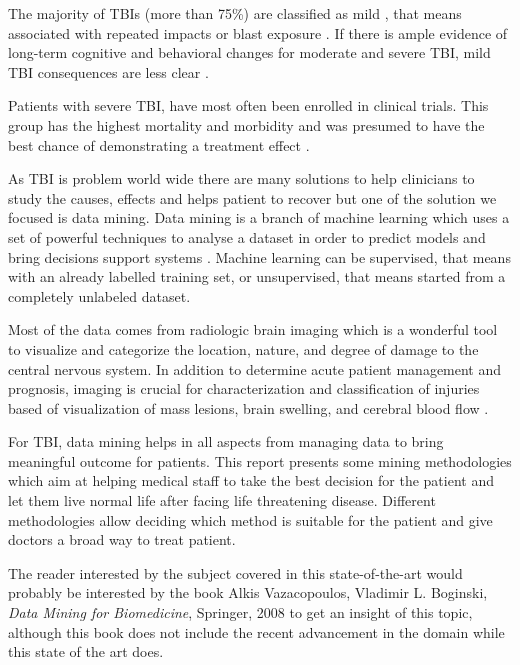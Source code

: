 \documentclass[runningheads]{llncs}
\begin{document}
The majority of TBIs (more than 75\%) are classified as mild \cite{wozniak_neurocognitive_2007}, that means associated with repeated impacts or blast exposure \cite{duhaime_common_2010}. If there is ample evidence of long-term cognitive and behavioral changes for moderate and severe TBI, mild TBI consequences are less clear \cite{wozniak_neurocognitive_2007}.

Patients with severe TBI, have most often been enrolled in clinical trials. This group has the highest mortality and morbidity and was presumed to have the best chance of demonstrating a treatment effect \cite{saatman_classification_2008}.

As TBI is problem world wide there are many solutions to help clinicians to study the causes, effects and helps patient to recover but one of the solution we focused is data mining. Data mining is a branch of machine learning which uses a set of powerful techniques to analyse a dataset in order to predict models and bring decisions support systems \cite{marcano-cedeno_data_2013}. Machine learning can be supervised, that means with an already labelled training set, or unsupervised, that means started from a completely unlabeled dataset.

Most of the data comes from radiologic brain imaging which is a wonderful tool to visualize and categorize the location, nature, and degree of damage to the central nervous system. In addition to determine acute patient management and prognosis, imaging is crucial for characterization and classification of injuries based of visualization of mass lesions, brain swelling, and cerebral blood flow \cite{duhaime_common_2010}.

For TBI, data mining helps in all aspects from managing data to bring meaningful outcome for patients. This report presents some mining methodologies which aim at helping medical staff to take the best decision for the patient and let them live normal life after facing life threatening disease. Different methodologies allow deciding which method is suitable for the patient and give doctors a broad way to treat patient.

The reader interested by the subject covered in this state-of-the-art would probably be interested by the book Alkis Vazacopoulos, Vladimir L. Boginski, \emph{Data Mining for Biomedicine}, Springer, 2008 \cite{pardalos_data_2008} to get an insight of this topic, although this book does not include the recent advancement in the domain while this state of the art does.
\end{document}
